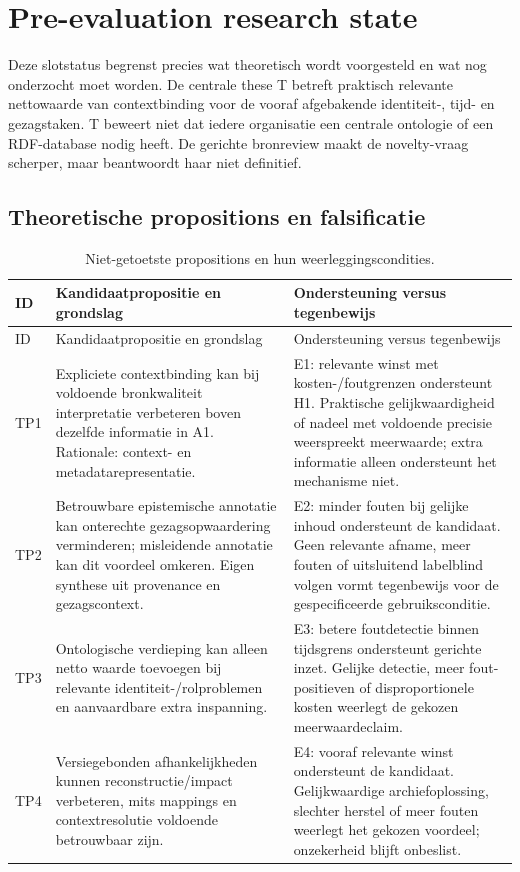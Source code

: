 \section{Pre-evaluation research state}
\label{sec:pre-evaluation}
Deze slotstatus begrenst precies wat theoretisch wordt voorgesteld en wat nog onderzocht moet worden. De centrale these T betreft praktisch relevante nettowaarde van contextbinding voor de vooraf afgebakende identiteit-, tijd- en gezagstaken. T beweert niet dat iedere organisatie een centrale ontologie of een RDF-database nodig heeft. De gerichte bronreview maakt de novelty-vraag scherper, maar beantwoordt haar niet definitief.

\subsection{Theoretische propositions en falsificatie}
\begin{longtable}{@{}P{.08\linewidth}P{.42\linewidth}P{.42\linewidth}@{}}
\caption{Niet-getoetste propositions en hun weerleggingscondities.}\\
\toprule ID & Kandidaatpropositie en grondslag & Ondersteuning versus tegenbewijs \\ \midrule\endfirsthead
\toprule ID & Kandidaatpropositie en grondslag & Ondersteuning versus tegenbewijs \\ \midrule\endhead
TP1 & Expliciete contextbinding kan bij voldoende bronkwaliteit interpretatie verbeteren boven dezelfde informatie in A1. Rationale: context- en metadatarepresentatie. \citep{S08,S33,L13} & E1: relevante winst met kosten-/foutgrenzen ondersteunt H1. Praktische gelijkwaardigheid of nadeel met voldoende precisie weerspreekt meerwaarde; extra informatie alleen ondersteunt het mechanisme niet. \\
TP2 & Betrouwbare epistemische annotatie kan onterechte gezagsopwaardering verminderen; misleidende annotatie kan dit voordeel omkeren. Eigen synthese uit provenance en gezagscontext. \citep{S33,S25} & E2: minder fouten bij gelijke inhoud ondersteunt de kandidaat. Geen relevante afname, meer fouten of uitsluitend labelblind volgen vormt tegenbewijs voor de gespecificeerde gebruiksconditie. \\
TP3 & Ontologische verdieping kan alleen netto waarde toevoegen bij relevante identiteit-/rolproblemen en aanvaardbare extra inspanning. \citep{L08,L09,L10} & E3: betere foutdetectie binnen tijdsgrens ondersteunt gerichte inzet. Gelijke detectie, meer fout-positieven of disproportionele kosten weerlegt de gekozen meerwaardeclaim. \\
TP4 & Versiegebonden afhankelijkheden kunnen reconstructie/impact verbeteren, mits mappings en contextresolutie voldoende betrouwbaar zijn. \citep{L14,S33,S47} & E4: vooraf relevante winst ondersteunt de kandidaat. Gelijkwaardige archiefoplossing, slechter herstel of meer fouten weerlegt het gekozen voordeel; onzekerheid blijft onbeslist. \\
\bottomrule\end{longtable}

